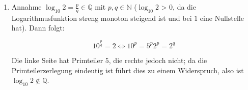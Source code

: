 \begin{enumerate}
\item Annahme $\log_{10} 2 = \frac{p}{q} \in \mathbb{Q}$ mit $p,q \in
\mathbb{N}$ ($\log_{10} 2$ > 0, da die Logarithmusfunktion streng monoton
steigend ist und bei $1$ eine Nullstelle hat). Dann folgt:

\[ 10^{\frac{p}{q}} = 2 \Leftrightarrow 10^p = 5^p 2^p = 2^q \]

Die linke Seite hat Primteiler $5$, die rechte jedoch nicht; da die
Primteilerzerlegung eindeutig ist führt dies zu einem Widerspruch, also ist
$\log_{10} 2 \not\in \mathbb{Q}$.
\end{enumerate}

